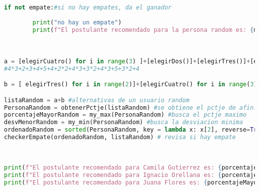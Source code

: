 \documentclass[a4paper]{article}
\begin{document}
\begin{lstlisting}[language=Python]
    if not empate:#si no hay empates, da el ganador
        
        print("no hay un empate")
        print(f"El postulante recomendado para la persona random es: {max_1[0]}; ya que tienen un porcentaje de afinidad total de: {max_1[2]*100}%")
        


a = [elegirCuatro() for i in range(3) ]+[elegirDos()]+[elegirTres()]+[elegirCuatro()]+[elegirCinco()]+[elegirCuatro()]+[elegirDos() for i in range(2)]+[elegirCuatro() for i in range(3)]
#4*3+2+3+4+5+4+2*2+4*3+3*2+4*3+5+3*2+4

b = [ elegirTres() for i in range(2)]+[elegirCuatro() for i in range(3)]+[elegirCinco()]+[ elegirTres() for i in range(2)]+[elegirCuatro()]

listaRandom = a+b #alternativas de un usuario random
PersonaRandom = obtenerPctje(listaRandom) #se obtiene el pctje de afin. tot. y desv. std. para el usuario random con cada candidato
porcentajeMayorRandom = my_max(PersonaRandom) #busca el pctje maximo
desvMenorRandom = my_min(PersonaRandom) #busca la desviacion minima
ordenadoRandom = sorted(PersonaRandom, key = lambda x: x[2], reverse=True) #ordena de manyor a menor la lista de coef. afin. tot. 
checkerEmpate(ordenadoRandom, listaRandom) # revisa si hay empate
    
    

print(f"El postulante recomendado para Camila Gutierrez es: {porcentajeMayorC[0]}; ya que tienen un porcentaje de afinidad total de: {porcentajeMayorC[2]*100}%")
print(f"El postulante recomendado para Ignacio Orellana es: {porcentajeMayorI[0]}; ya que tienen un porcentaje de afinidad total de: {porcentajeMayorI[2]*100}%")
print(f"El postulante recomendado para Juana Flores es: {porcentajeMayorJ[0]}; ya que tienen un porcentaje de afinidad total de: {porcentajeMayorJ[2]*100}%")
\end{lstlisting}
\end{document}
